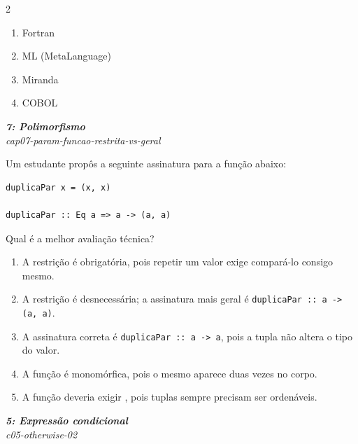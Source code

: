 \documentclass[a4paper,10pt,brazil]{article}
\begin{document}
\begin{multicols}{2}
\begin{enumerate}
  \item Fortran

  \item ML (MetaLanguage)

  \item Miranda

  \item COBOL


\end{enumerate}

\begin{flushright}
  \footnotesize
  \textit{\textbf{7: Polimorfismo}}\\
  \textit{cap07-param-funcao-restrita-vs-geral}\\

\end{flushright}
Um estudante propôs a seguinte assinatura para a função abaixo:

\begin{verbatim}
duplicaPar x = (x, x)

duplicaPar :: Eq a => a -> (a, a)
\end{verbatim}

Qual é a melhor avaliação técnica?

\begin{enumerate}
  \item A restrição  é obrigatória, pois repetir um valor exige compará-lo consigo mesmo.
  \item A restrição  é desnecessária; a assinatura mais geral é \texttt{duplicaPar :: a -> (a, a)}.
  \item A assinatura correta é \texttt{duplicaPar :: a -> a}, pois a tupla não altera o tipo do valor.
  \item A função é monomórfica, pois o mesmo  aparece duas vezes no corpo.
  \item A função deveria exigir , pois tuplas sempre precisam ser ordenáveis.

\end{enumerate}

\begin{flushright}
  \footnotesize
  \textit{\textbf{5: Expressão condicional}}\\
  \textit{c05-otherwise-02}\\


\end{flushright}
\end{multicols}
\end{document}
